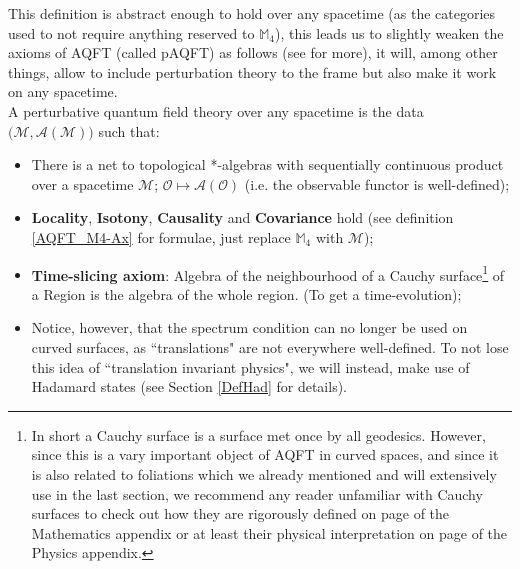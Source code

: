 \documentclass[a4paper,11pt]{article}
\numberwithin{equation}{section}
\theoremstyle{definition}
\begin{document}
This definition is abstract enough to hold over any spacetime (as the categories used to not require anything reserved to $\mathbb{M}_4$), this leads us to slightly weaken the axioms of AQFT (called pAQFT) as follows (see \cite{pAQFT} for more), it will, among other things, allow to include perturbation theory to the frame but also make it work on any spacetime.\\
A perturbative quantum field theory over any spacetime is the data $\big(\mathcal{M},\mathcal{A}(\mathcal{M})\big)$ such that:
\begin{itemize}
    \item There is a net to topological *-algebras with sequentially continuous product over a spacetime $\mathcal{M}$; $\mathcal{O}\mapsto\mathcal{A}(\mathcal{O})$ (i.e. the observable functor is well-defined);
    \item \textbf{Locality}, \textbf{Isotony}, \textbf{Causality} and \textbf{Covariance} hold (see definition \ref{AQFT_M4-Ax} for formulae, just replace $\mathbb{M}_4$ with $\mathcal{M}$);
    \item \textbf{Time-slicing axiom}: Algebra of the neighbourhood of a Cauchy surface\footnote{In short a Cauchy surface is a surface met once by all geodesics. However, since this is a vary important object of AQFT in curved spaces, and since it is also related to foliations which we already mentioned and will extensively use in the last section, we recommend any reader unfamiliar with Cauchy surfaces to check out how they are rigorously defined on page \pageref{CauchyMat} of the Mathematics appendix or at least their physical interpretation on page \pageref{CauchyPhy} of the Physics appendix.} of a Region is the algebra of the whole region. (To get a time-evolution);
    \item Notice, however, that the spectrum condition can no longer be used on curved surfaces, as ``translations" are not everywhere well-defined. To not lose this idea of ``translation invariant physics", we will instead, make use of Hadamard states \label{FirstMentionHad}(see Section \ref{DefHad} for details).
\end{itemize}
\end{document}
